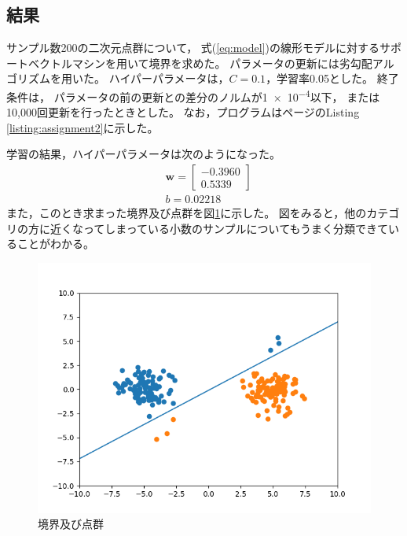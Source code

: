 \documentclass[class=jsarticle, crop=false, dvipdfmx, fleqn]{standalone}
\begin{document}
\subsection*{結果}

サンプル数200の二次元点群について，
式(\ref{eq:model})の線形モデルに対するサポートベクトルマシンを用いて境界を求めた。
パラメータの更新には劣勾配アルゴリズムを用いた。
ハイパーパラメータは，\(C = 0.1\)，学習率0.05とした。
終了条件は，
パラメータの前の更新との差分のノルムが\num{1e-4}以下，
または10,000回更新を行ったときとした。
なお，プログラムは\pageref{listing:assignment2}ページのListing \ref{listing:assignment2}に示した。

学習の結果，ハイパーパラメータは次のようになった。
\begin{align}
    & \bm{w} =
        \begin{bmatrix}
            -0.3960 \\
            0.5339
        \end{bmatrix} \\
    & b = 0.02218
\end{align}
また，このとき求まった境界及び点群を図\ref{fig:result}に示した。
図をみると，他のカテゴリの方に近くなってしまっている小数のサンプルについてもうまく分類できていることがわかる。


\begin{figure}
    \centering
    \includegraphics[clip, width=12cm]{../figures/assignment2_result}
    \caption{境界及び点群}
    \label{fig:result}
\end{figure}
\end{document}
